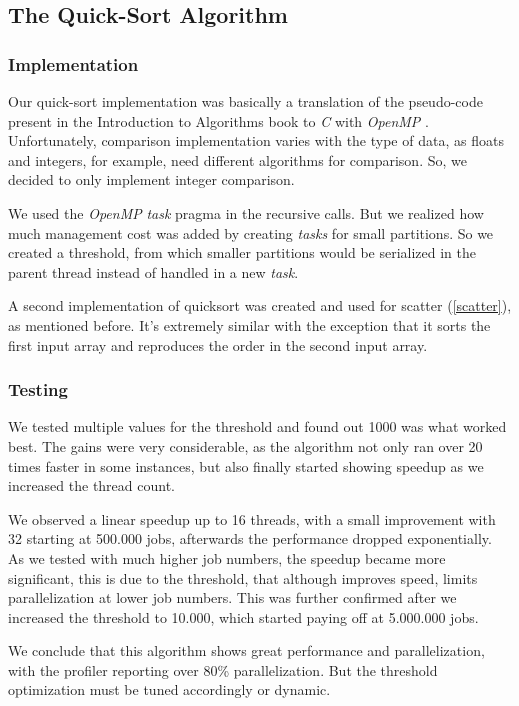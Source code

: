 \documentclass[10pt,journal]{IEEEtran}
\begin{document}
\subsection{The Quick-Sort Algorithm}

\subsubsection{Implementation}

Our quick-sort implementation was basically a translation of the pseudo-code present in the Introduction to Algorithms book to \textit{C} with \textit{OpenMP} \cite{introalgs}. Unfortunately, comparison implementation varies with the type of data, as floats and integers, for example, need different algorithms for comparison. So, we decided to only implement integer comparison.

We used the \textit{OpenMP} \textit{task} pragma in the recursive calls. But we realized how much management cost was added by creating \textit{tasks} for small partitions. So we created a threshold, from which smaller partitions would be serialized in the parent thread instead of handled in a new \textit{task}.

A second implementation of quicksort was created and used for scatter (\ref{scatter}), as mentioned before. It's extremely similar with the exception that it sorts the first input array and reproduces the order in the second input array.

\subsubsection{Testing}

We tested multiple values for the threshold and found out 1000 was what worked best. The gains were very considerable, as the algorithm not only ran over 20 times faster in some instances, but also finally started showing speedup as we increased the thread count.

We observed a linear speedup up to 16 threads, with a small improvement with 32 starting at 500.000 jobs, afterwards the performance dropped exponentially. As we tested with much higher job numbers, the speedup became more significant, this is due to the threshold, that although improves speed, limits parallelization at lower job numbers. This was further confirmed after we increased the threshold to 10.000, which started paying off at 5.000.000 jobs.

We conclude that this algorithm shows great performance and parallelization, with the profiler reporting over 80\% parallelization. But the threshold optimization must be tuned accordingly or dynamic.
\end{document}
